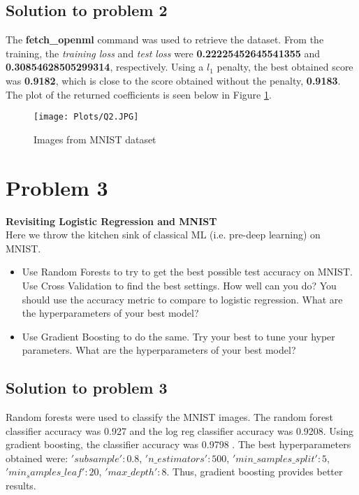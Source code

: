 \documentclass[12pt]{article}%
\begin{document}
\subsection{Solution to problem 2}

The \textbf{fetch\_openml} command was used to retrieve the dataset. From the training, the \emph{training loss} and \emph{test loss} were \textbf{0.22225452645541355} and \textbf{0.30854628505299314}, respectively. Using a $l_1$ penalty, the best obtained score was \textbf{0.9182}, which is close to the score obtained without the penalty, \textbf{0.9183}. The plot of the returned coefficients is seen below in Figure \ref{fig:Q2}.\\

\begin{figure}[h]
\texttt{[image: Plots/Q2.JPG]}
\centering
\caption{Images from MNIST dataset}
\label{fig:Q2}
\centering
\end{figure}


\section{Problem 3}

\textbf{Revisiting Logistic Regression and MNIST}\\

Here we throw the kitchen sink of classical ML (i.e. pre-deep learning) on MNIST.

\begin{itemize}
    \item Use Random Forests to try to get the best possible test accuracy on MNIST. Use Cross Validation to find the best settings. How well can you do? You should use the accuracy metric to compare to logistic regression. What are the hyperparameters of your best model?
    \item Use Gradient Boosting to do the same. Try your best to tune your hyper parameters. What are the hyperparameters of your best model?
\end{itemize}

\subsection{Solution to problem 3}

Random forests were used to classify the MNIST images. The random forest classifier accuracy was 0.927 and the log reg classifier accuracy was 0.9208. Using gradient boosting, the classifier accuracy was 0.9798 . The best hyperparameters obtained were: {$'subsample': 0.8$, $'n\_estimators': 500$, $'min\_samples\_split': 5$, $'min_samples\_leaf': 20$, $'max\_depth': 8$}. Thus, gradient boosting provides better results.\\
\end{document}
